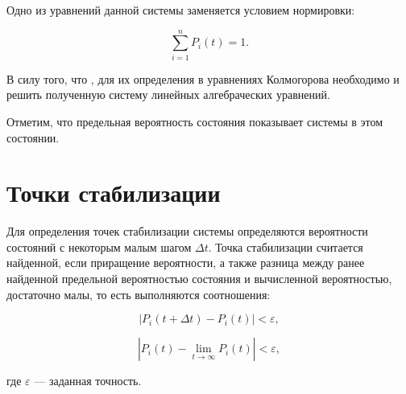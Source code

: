 Одно из уравнений данной системы заменяется условием нормировки:

\begin{equation}
    \sum\limits_{i=1}^{n} P_i(t) = 1.
\end{equation}

В силу того, что , для их
определения в уравнениях Колмогорова необходимо  и решить полученную систему линейных алгебраческих уравнений.

Отметим, что предельная вероятность состояния показывает  системы в этом состоянии.

\section{Точки стабилизации}

Для определения точек стабилизации системы определяются вероятности состояний с
некоторым малым шагом $\Delta t$. Точка стабилизации считается найденной, если
приращение вероятности, а также разница между ранее найденной предельной
вероятностью состояния и вычисленной вероятностью, достаточно малы, то есть
выполняются соотношения:

\begin{equation}
    |P_i(t + \Delta t) -  P_i(t)| < \varepsilon,
\end{equation}

\begin{equation}
    |P_i(t) -  \lim_{t \rightarrow \infty} P_i(t)| < \varepsilon,
\end{equation}

где $\varepsilon$ --- заданная точность.
